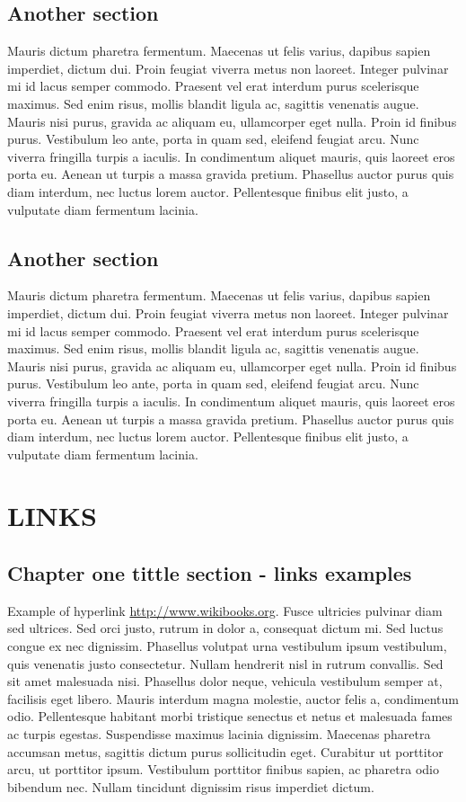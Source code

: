 \section{Another section}
Mauris dictum pharetra fermentum. Maecenas ut felis varius, dapibus sapien imperdiet, dictum dui. Proin feugiat viverra metus non laoreet. Integer pulvinar mi id lacus semper commodo. Praesent vel erat interdum purus scelerisque maximus. Sed enim risus, mollis blandit ligula ac, sagittis venenatis augue. Mauris nisi purus, gravida ac aliquam eu, ullamcorper eget nulla. Proin id finibus purus. Vestibulum leo ante, porta in quam sed, eleifend feugiat arcu. Nunc viverra fringilla turpis a iaculis. In condimentum aliquet mauris, quis laoreet eros porta eu. Aenean ut turpis a massa gravida pretium. Phasellus auctor purus quis diam interdum, nec luctus lorem auctor. Pellentesque finibus elit justo, a vulputate diam fermentum lacinia. 
\section{Another section}
Mauris dictum pharetra fermentum. Maecenas ut felis varius, dapibus sapien imperdiet, dictum dui. Proin feugiat viverra metus non laoreet. Integer pulvinar mi id lacus semper commodo. Praesent vel erat interdum purus scelerisque maximus. Sed enim risus, mollis blandit ligula ac, sagittis venenatis augue. Mauris nisi purus, gravida ac aliquam eu, ullamcorper eget nulla. Proin id finibus purus. Vestibulum leo ante, porta in quam sed, eleifend feugiat arcu. Nunc viverra fringilla turpis a iaculis. In condimentum aliquet mauris, quis laoreet eros porta eu. Aenean ut turpis a massa gravida pretium. Phasellus auctor purus quis diam interdum, nec luctus lorem auctor. Pellentesque finibus elit justo, a vulputate diam fermentum lacinia. 

\chapter{LINKS}
\section{Chapter one tittle section - links examples}
Example of hyperlink \url{http://www.wikibooks.org}. Fusce ultricies pulvinar diam sed ultrices. Sed orci justo, rutrum in dolor a, consequat dictum mi. Sed luctus congue ex nec dignissim. Phasellus volutpat urna vestibulum ipsum vestibulum, quis venenatis justo consectetur. Nullam hendrerit nisl in rutrum convallis. Sed sit amet malesuada nisi. Phasellus dolor neque, vehicula vestibulum semper at, facilisis eget libero. Mauris interdum magna molestie, auctor felis a, condimentum odio. Pellentesque habitant morbi tristique senectus et netus et malesuada fames ac turpis egestas. Suspendisse maximus lacinia dignissim. Maecenas pharetra accumsan metus, sagittis dictum purus sollicitudin eget. Curabitur ut porttitor arcu, ut porttitor ipsum. Vestibulum porttitor finibus sapien, ac pharetra odio bibendum nec. Nullam tincidunt dignissim risus imperdiet dictum.

